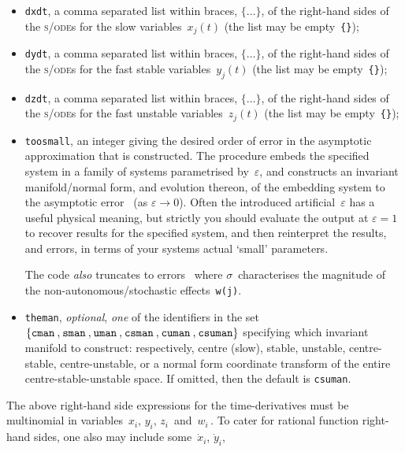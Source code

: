 \documentclass[11pt,a5paper]{article}
\def\eps{\ensuremath{\varepsilon}}
\def\sde{\textsc{s/ode}}
\begin{document}
\begin{itemize}
\item \verb|dxdt|, a comma separated list within braces,
\(\{\ldots\}\), of the right-hand sides of the \sde{}s for
the slow variables~\(x_j(t)\) (the list may be
empty~\verb|{}|);

\item \verb|dydt|, a comma separated list within braces,
\(\{\ldots\}\), of the right-hand sides of the \sde{}s for
the fast stable variables~\(y_j(t)\) (the list may be
empty~\verb|{}|);

\item \verb|dzdt|, a comma separated list within braces,
\(\{\ldots\}\), of the right-hand sides of the \sde{}s for
the fast unstable variables~\(z_j(t)\) (the list may be
empty~\verb|{}|);

\item \verb|toosmall|, an integer giving the desired order
of error in the asymptotic approximation that is
constructed.  The procedure embeds the specified system in a
family of systems parametrised by~\(\eps\), and constructs
an invariant manifold\slash normal form, and evolution
thereon, of the embedding system to the asymptotic
error~\Ord{\eps^{\tt toosmall}} (as \(\eps\to0\)).  Often
the introduced artificial~\(\eps\) has a useful physical
meaning, but strictly you should evaluate the output at
\(\eps=1\) to recover results for the specified system, and
then reinterpret the results, and errors, in terms of your
systems actual `small' parameters.

The code \emph{also} truncates to errors~
where \(\sigma\)~characterises the magnitude of the
non-autonomous\slash stochastic effects~\verb|w(j)|.

\item \verb|theman|, \emph{optional}, \emph{one} of the
identifiers in the set \(\{\verb|cman|\C \verb|sman|\C
\verb|uman|\C \verb|csman|\C \verb|cuman|\C
\verb|csuman|\}\) specifying which invariant manifold to
construct: respectively, centre (slow), stable, unstable,
centre-stable, centre-unstable, or a normal form coordinate
transform of the entire centre-stable-unstable space.  If
omitted, then the default is \verb|csuman|.
\end{itemize}

The above right-hand side expressions for the
time-derivatives must be multinomial in variables~$x_i$,
$y_i$, $z_i$~and~$w_i$\,.  To cater for rational function
right-hand sides, one also may include some~\(\dot x_i\),
\(\dot y_i\), 
\end{document}
